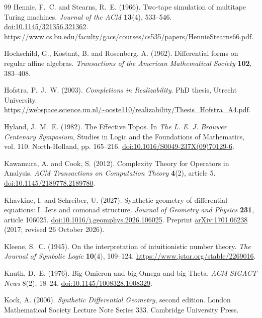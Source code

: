\documentclass[11pt,a4paper]{article}
\numberwithin{algorithm}{section}
\numberwithin{equation}{section}
\theoremstyle{definition}
\theoremstyle{remark}
\theoremstyle{plain}
\theoremstyle{definition}
\theoremstyle{plain}
\begin{document}
\begin{thebibliography}{99}
Hennie, F.~C. and Stearns, R.~E. (1966).
Two-tape simulation of multitape Turing machines.
\emph{Journal of the ACM} \textbf{13}(4), 533--546.
\href{https://doi.org/10.1145/321356.321362}{doi:10.1145/321356.321362}.
\url{https://www.cs.bu.edu/faculty/gacs/courses/cs535/papers/HennieStearns66.pdf}.

Hochschild, G., Kostant, B. and Rosenberg, A. (1962).
Differential forms on regular affine algebras.
\emph{Transactions of the American Mathematical Society}
\textbf{102}, 383--408.

Hofstra, P.~J.~W. (2003).
\emph{Completions in Realizability}.
PhD thesis, Utrecht University.
\url{https://webspace.science.uu.nl/~ooste110/realizability/Thesis_Hofstra_A4.pdf}.

Hyland, J.~M.~E. (1982).
The Effective Topos.
In \emph{The L. E. J. Brouwer Centenary Symposium}, Studies in Logic and the Foundations of Mathematics, vol. 110. North-Holland, pp. 165--216.
\href{https://doi.org/10.1016/S0049-237X(09)70129-6}{doi:10.1016/S0049-237X(09)70129-6}.

Kawamura, A. and Cook, S. (2012).
Complexity Theory for Operators in Analysis.
\emph{ACM Transactions on Computation Theory} \textbf{4}(2), article 5.
\href{https://doi.org/10.1145/2189778.2189780}{doi:10.1145/2189778.2189780}.

Khavkine, I. and Schreiber, U. (2027).
Synthetic geometry of differential equations:
I. Jets and comonad structure.
\emph{Journal of Geometry and Physics} \textbf{231}, article 106025.
\href{https://doi.org/10.1016/j.geomphys.2026.106025}{doi:10.1016/j.geomphys.2026.106025}.
Preprint \href{https://arxiv.org/abs/1701.06238}{arXiv:1701.06238}
(2017; revised 26 October 2026).

Kleene, S.~C. (1945).
On the interpretation of intuitionistic number theory.
\emph{The Journal of Symbolic Logic} \textbf{10}(4), 109--124.
\url{https://www.jstor.org/stable/2269016}.

Knuth, D.~E. (1976).
Big Omicron and big Omega and big Theta.
\emph{ACM SIGACT News} 8(2), 18--24.
\href{https://doi.org/10.1145/1008328.1008329}
{doi:10.1145/1008328.1008329}.

Kock, A. (2006).
\emph{Synthetic Differential Geometry}, second edition.
London Mathematical Society Lecture Note Series 333.
Cambridge University Press.


\end{thebibliography}
\end{document}
